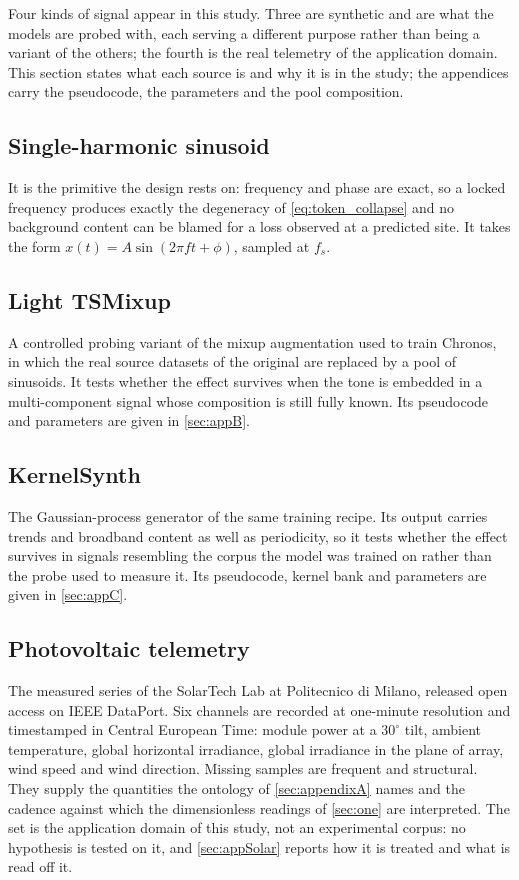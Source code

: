 Four kinds of signal appear in this study. Three are synthetic and are what the models are probed with, each serving a different purpose rather than being a variant of the others; the fourth is the real telemetry of the application domain. This section states what each source is and why it is in the study; the appendices carry the pseudocode, the parameters and the pool composition.

\subsection*{Single-harmonic sinusoid}

It is the primitive the design rests on: frequency and phase are exact, so a locked frequency produces exactly the degeneracy of \autoref{eq:token_collapse} and no background content can be blamed for a loss observed at a predicted site. It takes the form $x(t)=A\sin(2\pi f t+\phi)$, sampled at $f_s$.

\subsection*{Light TSMixup}

A controlled probing variant of the mixup augmentation used to train Chronos\autocite{ansariChronosLearningLanguage2024}, in which the real source datasets of the original are replaced by a pool of sinusoids. It tests whether the effect survives when the tone is embedded in a multi-component signal whose composition is still fully known. Its pseudocode and parameters are given in \autoref{sec:appB}.

\subsection*{KernelSynth}

The Gaussian-process generator of the same training recipe\autocite{ansariChronosLearningLanguage2024}. Its output carries trends and broadband content as well as periodicity, so it tests whether the effect survives in signals resembling the corpus the model was trained on rather than the probe used to measure it. Its pseudocode, kernel bank and parameters are given in \autoref{sec:appC}.

\subsection*{Photovoltaic telemetry}

The measured series of the SolarTech Lab at Politecnico di Milano, released open access on IEEE DataPort\autocite{levaPhotovoltaicPowerWeather2020}. Six channels are recorded at one-minute resolution and timestamped in Central European Time: module power at a $30^\circ$ tilt, ambient temperature, global horizontal irradiance, global irradiance in the plane of array, wind speed and wind direction. Missing samples are frequent and structural. They supply the quantities the ontology of \autoref{sec:appendixA} names and the cadence against which the dimensionless readings of \autoref{sec:one} are interpreted. The set is the application domain of this study, not an experimental corpus: no hypothesis is tested on it, and \autoref{sec:appSolar} reports how it is treated and what is read off it.